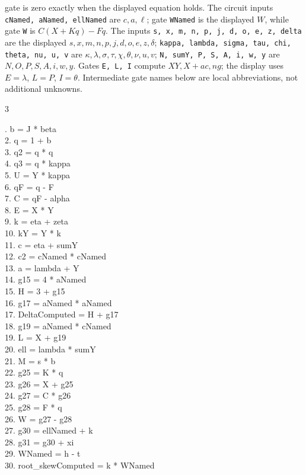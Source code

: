 \documentclass[10pt]{article}
\begin{document}
gate is zero exactly when the displayed equation holds. The circuit inputs
\texttt{cNamed, aNamed, ellNamed} are $c,a,\ell$; gate \texttt{WNamed} is the
displayed $W$, while gate \texttt{W} is $C(X+Kq)-Fq$. The inputs
\texttt{s, x, m, n, p, j, d, o, e, z, delta} are the displayed
$s,x,m,n,p,j,d,o,e,z,\delta$; \texttt{kappa, lambda, sigma, tau, chi, theta, nu, u, v}
are $\kappa,\lambda,\sigma,\tau,\chi,\theta,\nu,u,v$; \texttt{N, sumY, P, S, A, i, w, y}
are $N,O,P,S,A,i,w,y$. Gates \texttt{E, L, I} compute $XY,X+ac,ng$;
the display uses $E=\lambda$, $L=P$, $I=\theta$. Intermediate gate
names below are local abbreviations, not additional unknowns.
\begin{multicols}{3}
\raggedright\ttfamily\fontsize{6.5}{7.3}. b = J * beta\\
2. q = 1 + b\\
3. q2 = q * q\\
4. q3 = q * kappa\\
5. U = Y * kappa\\
6. qF = q - F\\
7. C = qF - alpha\\
8. E = X * Y\\
9. k = eta + zeta\\
10. kY = Y * k\\
11. c = eta + sumY\\
12. c2 = cNamed * cNamed\\
13. a = lambda + Y\\
14. g15 = 4 * aNamed\\
15. H = 3 + g15\\
16. g17 = aNamed * aNamed\\
17. DeltaComputed = H + g17\\
18. g19 = aNamed * cNamed\\
19. L = X + g19\\
20. ell = lambda * sumY\\
21. M = s * b\\
22. g25 = K * q\\
23. g26 = X + g25\\
24. g27 = C * g26\\
25. g28 = F * q\\
26. W = g27 - g28\\
27. g30 = ellNamed + k\\
28. g31 = g30 + xi\\
29. WNamed = h - t\\
30. root\_skewComputed = k * WNamed\\

\end{multicols}
\end{document}
